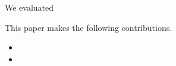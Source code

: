 We evaluated \tool {}

This paper makes the following contributions.

\begin{itemize}
\item 
\item
\end{itemize}











